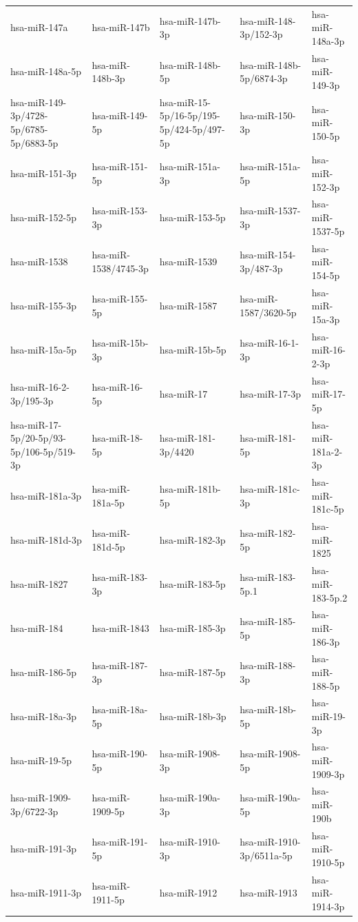 \begin{longtable}{lllll}
hsa-miR-147a & hsa-miR-147b & hsa-miR-147b-3p & hsa-miR-148-3p/152-3p & hsa-miR-148a-3p \\
hsa-miR-148a-5p & hsa-miR-148b-3p & hsa-miR-148b-5p & hsa-miR-148b-5p/6874-3p & hsa-miR-149-3p \\
hsa-miR-149-3p/4728-5p/6785-5p/6883-5p & hsa-miR-149-5p & hsa-miR-15-5p/16-5p/195-5p/424-5p/497-5p & hsa-miR-150-3p & hsa-miR-150-5p \\
hsa-miR-151-3p & hsa-miR-151-5p & hsa-miR-151a-3p & hsa-miR-151a-5p & hsa-miR-152-3p \\
hsa-miR-152-5p & hsa-miR-153-3p & hsa-miR-153-5p & hsa-miR-1537-3p & hsa-miR-1537-5p \\
hsa-miR-1538 & hsa-miR-1538/4745-3p & hsa-miR-1539 & hsa-miR-154-3p/487-3p & hsa-miR-154-5p \\
hsa-miR-155-3p & hsa-miR-155-5p & hsa-miR-1587 & hsa-miR-1587/3620-5p & hsa-miR-15a-3p \\
hsa-miR-15a-5p & hsa-miR-15b-3p & hsa-miR-15b-5p & hsa-miR-16-1-3p & hsa-miR-16-2-3p \\
hsa-miR-16-2-3p/195-3p & hsa-miR-16-5p & hsa-miR-17 & hsa-miR-17-3p & hsa-miR-17-5p \\
hsa-miR-17-5p/20-5p/93-5p/106-5p/519-3p & hsa-miR-18-5p & hsa-miR-181-3p/4420 & hsa-miR-181-5p & hsa-miR-181a-2-3p \\
hsa-miR-181a-3p & hsa-miR-181a-5p & hsa-miR-181b-5p & hsa-miR-181c-3p & hsa-miR-181c-5p \\
hsa-miR-181d-3p & hsa-miR-181d-5p & hsa-miR-182-3p & hsa-miR-182-5p & hsa-miR-1825 \\
hsa-miR-1827 & hsa-miR-183-3p & hsa-miR-183-5p & hsa-miR-183-5p.1 & hsa-miR-183-5p.2 \\
hsa-miR-184 & hsa-miR-1843 & hsa-miR-185-3p & hsa-miR-185-5p & hsa-miR-186-3p \\
hsa-miR-186-5p & hsa-miR-187-3p & hsa-miR-187-5p & hsa-miR-188-3p & hsa-miR-188-5p \\
hsa-miR-18a-3p & hsa-miR-18a-5p & hsa-miR-18b-3p & hsa-miR-18b-5p & hsa-miR-19-3p \\
hsa-miR-19-5p & hsa-miR-190-5p & hsa-miR-1908-3p & hsa-miR-1908-5p & hsa-miR-1909-3p \\
hsa-miR-1909-3p/6722-3p & hsa-miR-1909-5p & hsa-miR-190a-3p & hsa-miR-190a-5p & hsa-miR-190b \\
hsa-miR-191-3p & hsa-miR-191-5p & hsa-miR-1910-3p & hsa-miR-1910-3p/6511a-5p & hsa-miR-1910-5p \\
hsa-miR-1911-3p & hsa-miR-1911-5p & hsa-miR-1912 & hsa-miR-1913 & hsa-miR-1914-3p \\

\end{longtable}
